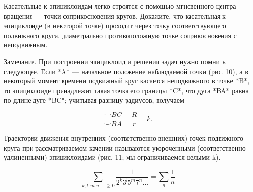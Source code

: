 Касательные к эпициклоидам легко строятся с помощью мгновенного центра вращения — точки соприкосновения кругов. Докажите, что касательная к эпициклоиде (в некоторой точке) проходит через точку соответствующего подвижного круга, диаметрально противоположную точке соприкосновения с неподвижным.

Замечание. При построении эпициклоид и решении задач нужно помнить следующее. Если *A* — начальное положение наблюдаемой точки (рис. 10), а в некоторый момент времени подвижный круг касается неподвижного в точке *B*, то эпициклоиде принадлежит такая точка его границы *C*, что дуга *BA* равна по длине дуге *BC*; учитывая разницу радиусов, получаем

\[
\frac{\smile BC}{\smile BA} = \frac{R}{r} = k.
\]

Траектории движения внутренних (соответственно внешних) точек подвижного круга при рассматриваемом качении называются укороченными (соответственно удлиненными) эпициклоидами (рис. 11; мы ограничиваемся целыми k).

\[
\sum_{k,l,m,n,... \ge 0} \frac{1}{2^k 3^l 5^m 7^n ...} = \sum_n \frac{1}{n}
\]
